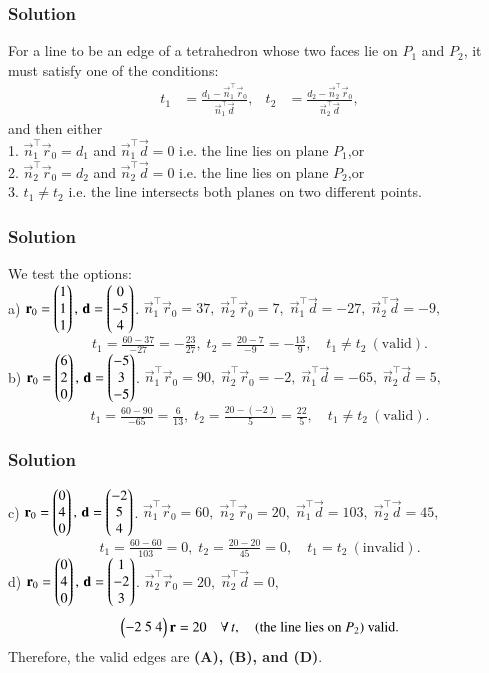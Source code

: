 \documentclass{beamer}
\numberwithin{equation}{section}
\begin{document}
\begin{frame}[fragile]
    \frametitle{Solution}
 For a line to be an edge of a tetrahedron whose two faces lie on $P_1$ and $P_2$, it must satisfy one of the conditions:
\begin{align}
t_1 &= \frac{d_1 - \vec{n}_1^\top\vec{r}_0}{\vec{n}_1^\top\vec{d}},&
t_2 &= \frac{d_2 - \vec{n}_2^\top\vec{r}_0}{\vec{n}_2^\top\vec{d}},
\end{align}
and then either\\
  1. $\vec{n}_1^\top\vec{r}_0=d_1$ and $\vec{n}_1^\top\vec{d}=0$ i.e. the line lies on plane $P_{1}$,or \\
  2.  $\vec{n}_2^\top\vec{r}_0=d_2$ and $\vec{n}_2^\top\vec{d}=0$ i.e. the line lies on plane $P_{2}$,or \\
  3.  $t_1\neq t_2$ i.e. the line intersects both planes on two different points.

\end{frame}
\begin{frame}[fragile]
    \frametitle{Solution}
We test the options:\\
  a) $\displaystyle \mathbf{r}_0=\begin{pmatrix}1\\1\\1\end{pmatrix},\,\mathbf{d}=\begin{pmatrix}0\\-5\\4\end{pmatrix}$. 
    \(\vec{n}_1^\top\vec{r}_0=37,\;\vec{n}_2^\top\vec{r}_0=7,\;
    \vec{n}_1^\top\vec{d}=-27,\;\vec{n}_2^\top\vec{d}=-9,\)
    \[
      t_1=\tfrac{60-37}{-27}=-\tfrac{23}{27},\;
      t_2=\tfrac{20-7}{-9}=-\tfrac{13}{9},\quad t_1\neq t_2\ (\text{valid}).
    \]
  b) $\displaystyle \mathbf{r}_0=\begin{pmatrix}6\\2\\0\end{pmatrix},\,\mathbf{d}=\begin{pmatrix}-5\\3\\-5\end{pmatrix}$. 
    \(\vec{n}_1^\top\vec{r}_0=90,\;\vec{n}_2^\top\vec{r}_0=-2,\;
    \vec{n}_1^\top\vec{d}=-65,\;\vec{n}_2^\top\vec{d}=5,\)
    \[
      t_1=\tfrac{60-90}{-65}=\tfrac{6}{13},\;
      t_2=\tfrac{20-(-2)}{5}=\tfrac{22}{5},\quad t_1\neq t_2\ (\text{valid}).
    \]
\end{frame}
\begin{frame}[fragile]
    \frametitle{Solution}
    c) $\displaystyle \mathbf{r}_0=\begin{pmatrix}0\\4\\0\end{pmatrix},\,\mathbf{d}=\begin{pmatrix}-2\\5\\4\end{pmatrix}$. 
    \(\vec{n}_1^\top\vec{r}_0=60,\;\vec{n}_2^\top\vec{r}_0=20,\;
    \vec{n}_1^\top\vec{d}=103,\;\vec{n}_2^\top\vec{d}=45,\)
    \[
      t_1=\tfrac{60-60}{103}=0,\;
      t_2=\tfrac{20-20}{45}=0,\quad t_1=t_2\ (\text{invalid}).
    \]
  d)  $\displaystyle \mathbf{r}_0=\begin{pmatrix}0\\4\\0\end{pmatrix},\,\mathbf{d}=\begin{pmatrix}1\\-2\\3\end{pmatrix}$. 
    \(\vec{n}_2^\top\vec{r}_0=20,\;\vec{n}_2^\top\vec{d}=0,\)
    \[
      \begin{pmatrix}-2 \ 5 \ 4 \end{pmatrix}\mathbf{r}=20\quad\forall\,t,
      \quad\text{(the line lies on }P_2\text{) valid}.
    \]
Therefore, the valid edges are \textbf{(A), (B), and (D)}.

\end{frame}
\end{document}
